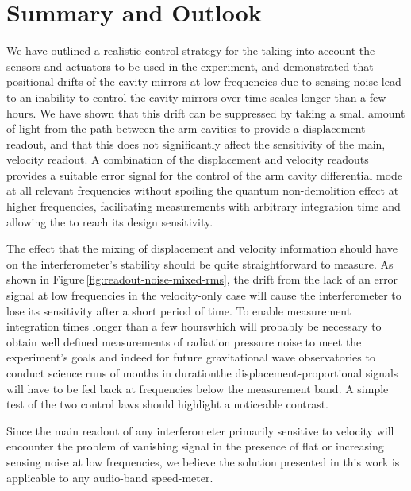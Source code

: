 \section{\label{sec:summary}Summary and Outlook}
We have outlined a realistic control strategy for the \SSMEXPT{} taking into account the sensors and actuators to be used in the experiment, and demonstrated that positional drifts of the cavity mirrors at low frequencies due to sensing noise lead to an inability to control the cavity mirrors over time scales longer than a few hours. We have shown that this drift can be suppressed by taking a small amount of light from the path between the arm cavities to provide a displacement readout, and that this does not significantly affect the sensitivity of the main, velocity readout. A combination of the displacement and velocity readouts provides a suitable error signal for the control of the arm cavity differential mode at all relevant frequencies without spoiling the quantum non-demolition effect at higher frequencies, facilitating measurements with arbitrary integration time and allowing the \SSM{} to reach its design sensitivity.

The effect that the mixing of displacement and velocity information should have on the interferometer's stability should be quite straightforward to measure. As shown in Figure\,\ref{fig:readout-noise-mixed-rms}, the drift from the lack of an error signal at low frequencies in the velocity-only case will cause the interferometer to lose its sensitivity after a short period of time. To enable measurement integration times longer than a few hours\textemdash which will probably be necessary to obtain well defined measurements of radiation pressure noise to meet the experiment's goals and indeed for future gravitational wave observatories to conduct science runs of months in duration\textemdash the displacement-proportional signals will have to be fed back at frequencies below the measurement band. A simple test of the two control laws should highlight a noticeable contrast.

Since the main readout of any interferometer primarily sensitive to velocity will encounter the problem of vanishing signal in the presence of flat or increasing sensing noise at low frequencies, we believe the solution presented in this work is applicable to any audio-band speed-meter.